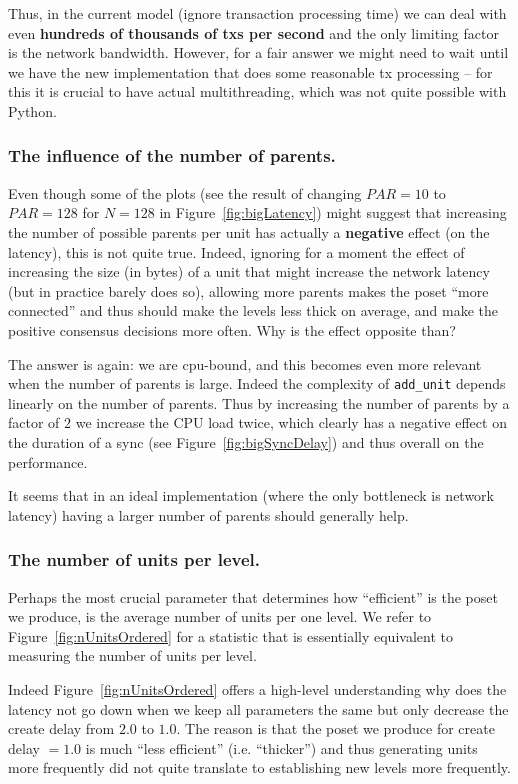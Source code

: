 \documentclass[a4paper,10pt]{article}
\begin{document}
				Thus, in the current model (ignore transaction processing time) we can deal with even {\bf hundreds of thousands of txs per second} and the only limiting factor is the network bandwidth.
				However, for a fair answer we might need to wait until we have the new implementation that does some reasonable tx processing -- for this it is crucial to have actual multithreading, which was not quite possible with Python.

			\subsubsection*{The influence of the number of parents.}
				Even though some of the plots (see the result of changing $PAR=10$ to $PAR=128$ for $N=128$ in Figure~\ref{fig:bigLatency}) might suggest that increasing the number of possible parents per unit has actually a {\bf negative} effect (on the latency), this is not quite true.
				Indeed, ignoring for a moment the effect of increasing the size (in bytes) of a unit that might increase the network latency (but in practice barely does so), allowing more parents makes the poset ``more connected'' and thus should make the levels less thick on average, and make the positive consensus decisions more often. Why is the effect opposite than?

				The answer is again: we are cpu-bound, and this becomes even more relevant when the number of parents is large. Indeed the complexity of \lstinline{add_unit} depends linearly on the number of parents. Thus by increasing the number of parents by a factor of $2$ we increase the CPU load twice, which clearly has a negative effect on the duration of a sync (see Figure~\ref{fig:bigSyncDelay}) and thus overall on the performance.

				It seems that in an ideal implementation (where the only bottleneck is network latency) having a larger number of parents should generally help.

			\subsubsection*{The number of units per level.}
				Perhaps the most crucial parameter that determines how ``efficient'' is the poset we produce, is the average number of units per one level.
				We refer to Figure~\ref{fig:nUnitsOrdered} for a statistic that is essentially equivalent to measuring the number of units per level.

				Indeed Figure~\ref{fig:nUnitsOrdered} offers a high-level understanding why does the latency not go down when we keep all parameters the same but only decrease the create delay from $2.0$ to $1.0$.
				The reason is that the poset we produce for create delay $=1.0$ is much ``less efficient'' (i.e. ``thicker'') and thus generating units more frequently did not quite translate to establishing new levels more frequently.
\end{document}

